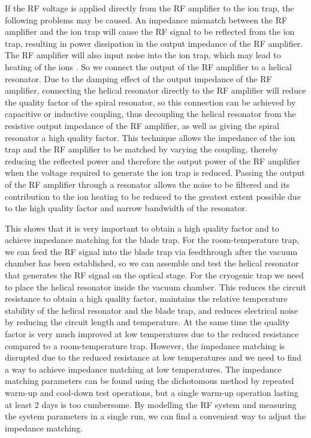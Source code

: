 If the RF voltage is applied directly from the RF amplifier to the ion trap, the following problems may be caused. An impedance mismatch between the RF amplifier and the ion trap will cause the RF signal to be reflected from the ion trap, resulting in power dissipation in the output impedance of the RF amplifier. The RF amplifier will also input noise into the ion trap, which may lead to heating of the ions \cite{RN360,RN162,RN276,RN135}. So we connect the output of the RF amplifier to a helical resonator. Due to the damping effect of the output impedance of the RF amplifier, connecting the helical resonator directly to the RF amplifier will reduce the quality factor of the spiral resonator, so this connection can be achieved by capacitive or inductive coupling, thus decoupling the helical resonator from the resistive output impedance of the RF amplifier, as well as giving the spiral resonator a high quality factor. This technique allows the impedance of the ion trap and the RF amplifier to be matched by varying the coupling, thereby reducing the reflected power and therefore the output power of the RF amplifier when the voltage required to generate the ion trap is reduced. Passing the output of the RF amplifier through a resonator allows the noise to be filtered and its contribution to the ion heating to be reduced to the greatest extent possible due to the high quality factor and narrow bandwidth of the resonator.

This shows that it is very important to obtain a high quality factor and to achieve impedance matching for the blade trap. For the room-temperature trap, we can feed the RF signal into the blade trap via feedthrough after the vacuum chamber has been established, so we can assemble and test the helical resonator that generates the RF signal on the optical stage. For the cryogenic trap we need to place the helical resonator inside the vacuum chamber. This reduces the circuit resistance to obtain a high quality factor, maintains the relative temperature stability of the helical resonator and the blade trap, and reduces electrical noise by reducing the circuit length and temperature. At the same time the quality factor is very much improved at low temperatures due to the reduced resistance compared to a room-temperature trap. However, the impedance matching is disrupted due to the reduced resistance at low temperatures and we need to find a way to achieve impedance matching at low temperatures. The impedance matching parameters can be found using the dichotomous method by repeated warm-up and cool-down test operations, but a single warm-up operation lasting at least 2 days is too cumbersome. By modelling the RF system and measuring the system parameters in a single run, we can find a convenient way to adjust the impedance matching.

